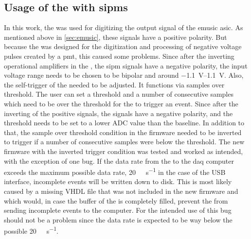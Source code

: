 \subsection{Usage of the  with \acp{sipm}}
In this work, the  was used for digitizing the output signal of the \ac{emusic} \ac{asic}.
As mentioned above in \autoref{sec:emusic}, these signals have a positive polarity.
But because the  was designed for the digitization and processing of negative voltage pulses created by a \ac{pmt}, this caused some problems.
Since after the inverting operational amplifiers in the , the \ac{sipm} signals have a negative polarity, the input voltage range needs to be chosen to be bipolar and around \SIrange{-1.1}{1.1}{\volt}.
Also, the self-trigger of the  needed to be adjusted.
It functions via samples over threshold.
The user can set a threshold and a number of consecutive samples which need to be over the threshold for the  to trigger an event.
Since after the inverting of the positive signals, the signals have a negative polarity, and the threshold needs to be set to a lower ADC value than the baseline.
In addition to that, the sample over threshold condition in the  firmware needed to be inverted to trigger if a number of consecutive samples were below the threshold.
The new firmware with the inverted trigger condition was tested and worked as intended, with the exception of one bug.
If the data rate from the  to the \ac{daq} computer exceeds the maximum possible data rate, \SI{20}{\mega\byte\per\second} in the case of the USB interface, incomplete events will be written down to disk.
This is most likely caused by a missing VHDL file that was not included in the new firmware and which would, in case the buffer of the  is completely filled, prevent the  from sending incomplete events to the computer.
For the intended use of this bug should not be a problem since the data rate is expected to be way below the possible \SI{20}{\mega\byte\per\second}.
